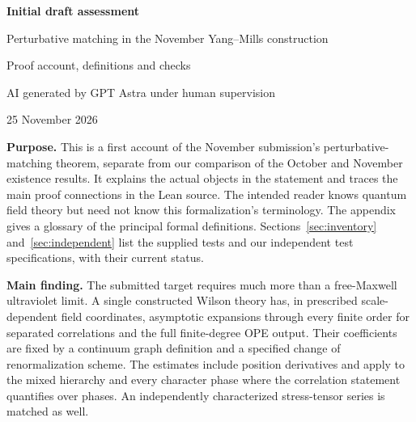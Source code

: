 \documentclass[11pt]{article}
\begin{document}
\begin{center}
{\large\bfseries Initial draft assessment}\par
{\large Perturbative matching in the November Yang--Mills construction}\par
{\small Proof account, definitions and checks}\par
{\small AI generated by GPT Astra under human supervision}\par
{\small 25 November 2026}
\end{center}

\textbf{Purpose.} This is a first account of the November submission's
perturbative-matching theorem, separate from our comparison of the October
and November existence results. It explains the actual objects in the
statement and traces the main proof connections in the Lean source.
The intended reader knows quantum field theory but need not know this
formalization's terminology. The appendix gives a glossary of the principal formal definitions.
Sections~\ref{sec:inventory} and~\ref{sec:independent} list the supplied
tests and our independent test specifications, with their current status.

\textbf{Main finding.} The submitted target requires much more than a
free-Maxwell ultraviolet limit. A single constructed Wilson theory has,
in prescribed scale-dependent field coordinates, asymptotic expansions
through every finite order for separated correlations and the full
finite-degree OPE output. Their coefficients are fixed by a continuum
graph definition and a specified change of renormalization scheme.
The estimates include position derivatives and apply to the mixed
hierarchy and every character phase where the correlation statement
quantifies over phases. An independently characterized stress-tensor
series is matched as well.
\end{document}
